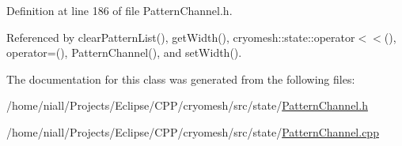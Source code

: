 \-Definition at line 186 of file \-Pattern\-Channel.\-h.



\-Referenced by clear\-Pattern\-List(), get\-Width(), cryomesh\-::state\-::operator$<$$<$(), operator=(), \-Pattern\-Channel(), and set\-Width().



\-The documentation for this class was generated from the following files\-:\begin{DoxyCompactItemize}
\item 
/home/niall/\-Projects/\-Eclipse/\-C\-P\-P/cryomesh/src/state/\hyperlink{PatternChannel_8h}{\-Pattern\-Channel.\-h}\item 
/home/niall/\-Projects/\-Eclipse/\-C\-P\-P/cryomesh/src/state/\hyperlink{PatternChannel_8cpp}{\-Pattern\-Channel.\-cpp}\end{DoxyCompactItemize}
